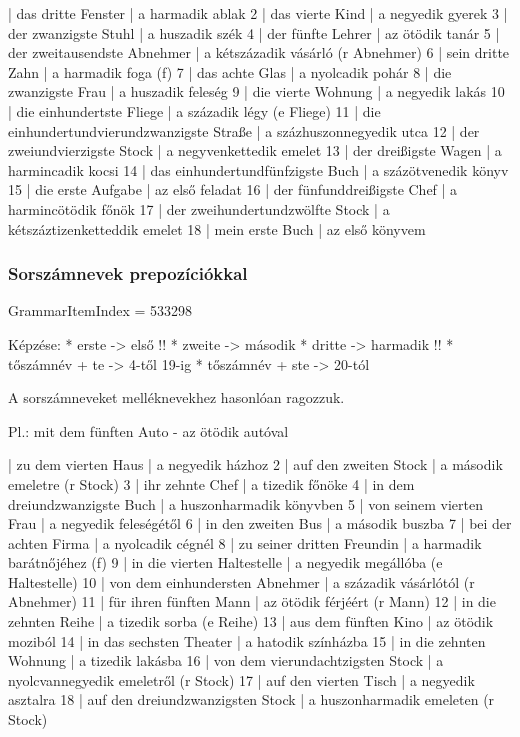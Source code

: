 \documentclass{article}
\newenvironment{desc}{\verbatim}{\endverbatim}
\newenvironment{exmp}{\verbatim}{\endverbatim}
\begin{document}
\begin{exmp}
1 | das dritte Fenster | a harmadik ablak
2 | das vierte Kind | a negyedik gyerek
3 | der zwanzigste Stuhl | a huszadik szék
4 | der fünfte Lehrer | az ötödik tanár
5 | der zweitausendste Abnehmer | a kétszázadik vásárló (r Abnehmer)
6 | sein dritte Zahn | a harmadik foga (f)
7 | das achte Glas | a nyolcadik pohár 
8 | die zwanzigste Frau | a huszadik feleség
9 | die vierte Wohnung | a negyedik lakás
10 | die einhundertste Fliege | a századik légy (e Fliege)
11 | die einhundertundvierundzwanzigste Straße | a százhuszonnegyedik utca
12 | der zweiundvierzigste Stock | a negyvenkettedik emelet
13 | der dreißigste Wagen | a harmincadik kocsi
14 | das einhundertundfünfzigste Buch | a százötvenedik könyv
15 | die erste Aufgabe | az első feladat
16 | der fünfunddreißigste Chef | a harmincötödik főnök
17 | der zweihundertundzwölfte Stock | a kétszáztizenketteddik emelet
18 | mein erste Buch | az első könyvem
\end{exmp}

\subsubsection{Sorszámnevek prepozíciókkal}

GrammarItemIndex = 533298

\begin{desc}
Képzése: * erste -> első !!
* zweite -> második
* dritte -> harmadik !!
* tőszámnév + te -> 4-től 19-ig
* tőszámnév + ste -> 20-tól

A sorszámneveket melléknevekhez hasonlóan ragozzuk.

Pl.: mit dem fünften Auto - az ötödik autóval
\end{desc}

\begin{exmp}
1 | zu dem vierten Haus | a negyedik házhoz
2 | auf den zweiten Stock | a második emeletre (r Stock)
3 | ihr zehnte Chef | a tizedik főnöke
4 | in dem dreiundzwanzigste Buch | a huszonharmadik könyvben
5 | von seinem vierten Frau | a negyedik feleségétől
6 | in den zweiten Bus | a második buszba
7 | bei der achten Firma | a nyolcadik cégnél
8 | zu seiner dritten Freundin | a harmadik barátnőjéhez (f)
9 | in die vierten Haltestelle | a negyedik megállóba (e Haltestelle)
10 | von dem einhundersten Abnehmer | a századik vásárlótól (r Abnehmer)
11 | für ihren fünften Mann | az ötödik férjéért (r Mann)
12 | in die zehnten Reihe | a tizedik sorba (e Reihe)
13 | aus dem fünften Kino | az ötödik moziból
14 | in das sechsten Theater | a hatodik színházba
15 | in die zehnten Wohnung | a tizedik lakásba
16 | von dem vierundachtzigsten Stock | a nyolcvannegyedik emeletről (r Stock)
17 | auf den vierten Tisch | a negyedik asztalra
18 | auf den dreiundzwanzigsten Stock | a huszonharmadik emeleten (r Stock)
\end{exmp}
\end{document}
